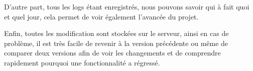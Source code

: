 \documentclass[12pt,a4paper,openany]{book}
\begin{document}
	D'autre part, tous les logs étant enregistrés, nous pouvons savoir qui à fait quoi et quel jour, cela permet de voir également l'avancée du projet. 

	Enfin, toutes les modification sont stockées sur le serveur, ainsi en cas de problème, il est très facile de revenir à la version précédente ou même de
	comparer deux versions afin de voir les changements et de comprendre rapidement pourquoi une fonctionnalité a régressé. 
	\appendix
	
	\label{gantt}
	
	\label{conception}
\end{document}
